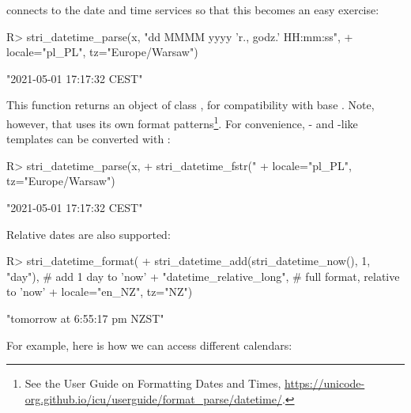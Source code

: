 \documentclass[nojss]{jss}
\begin{document}
 connects to the  date and time
services so that this becomes an easy exercise:


\begin{Schunk}
\begin{Sinput}
R> stri_datetime_parse(x, "dd MMMM yyyy 'r., godz.' HH:mm:ss",
+    locale="pl_PL", tz="Europe/Warsaw")
\end{Sinput}
\begin{Soutput}
[1] "2021-05-01 17:17:32 CEST"
\end{Soutput}
\end{Schunk}

This function returns an object of class ,
for compatibility with base .
Note, however, that
 uses its own format patterns\footnote{
See the  User Guide on {Formatting Dates and Times},
\url{https://unicode-org.github.io/icu/userguide/format_parse/datetime/}.
}. For convenience,
- and -like
templates can be converted with :

\begin{Schunk}
\begin{Sinput}
R> stri_datetime_parse(x,
+    stri_datetime_fstr("%d %B %Y r., godz. %H:%M:%S"),
+    locale="pl_PL", tz="Europe/Warsaw")
\end{Sinput}
\begin{Soutput}
[1] "2021-05-01 17:17:32 CEST"
\end{Soutput}
\end{Schunk}

\ifnotJSSversion
Relative dates are also supported:

\begin{Schunk}
\begin{Sinput}
R> stri_datetime_format(
+    stri_datetime_add(stri_datetime_now(), 1, "day"), # add 1 day to 'now'
+    "datetime_relative_long",              # full format, relative to 'now'
+    locale="en_NZ", tz="NZ")
\end{Sinput}
\begin{Soutput}
[1] "tomorrow at 6:55:17 pm NZST"
\end{Soutput}
\end{Schunk}
\fi

For example, here is how we can access different calendars:
\end{document}
